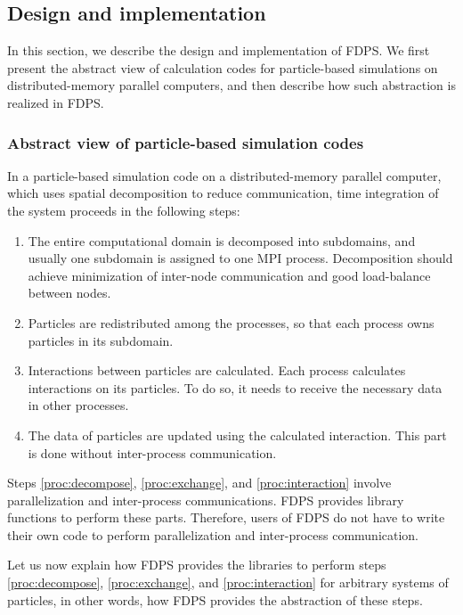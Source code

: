 \subsection{Design and implementation}
\label{sec:design}

In this section, we describe the design and implementation of FDPS. We
first present the abstract view of calculation codes for particle-based
simulations on distributed-memory parallel computers, and then
describe how such abstraction is realized in FDPS.

\subsubsection{Abstract view of particle-based simulation codes}
\label{sec:view}

In a particle-based simulation code on a distributed-memory parallel
computer, which uses spatial decomposition to reduce communication,
time integration of the system proceeds in the following steps:
\begin{enumerate}
\item The entire computational domain is decomposed into subdomains,
  and usually one subdomain is assigned to one MPI
  process. Decomposition should achieve minimization of inter-node
  communication and good load-balance between nodes.
 \label{proc:decompose}

\item Particles are redistributed among the processes, so that each
  process owns particles in its subdomain.\label{proc:exchange}

\item Interactions between  particles are calculated.
   Each process  calculates interactions on its particles. To do so,
   it needs to receive the necessary data in other processes.
  \label{proc:interaction}

\item The data of particles are updated using the calculated
  interaction. This part is done without inter-process communication.
   \label{proc:local}
\end{enumerate}

Steps \ref{proc:decompose}, \ref{proc:exchange}, and
\ref{proc:interaction} involve parallelization and inter-process
communications. FDPS provides library functions to perform these parts. Therefore, 
users of FDPS do not have to write their own code to perform 
parallelization and inter-process communication.

Let us now explain how FDPS provides the libraries to perform steps
\ref{proc:decompose}, \ref{proc:exchange}, and
\ref{proc:interaction} for arbitrary systems of particles, in other
words, how FDPS provides the abstraction of these steps. 

